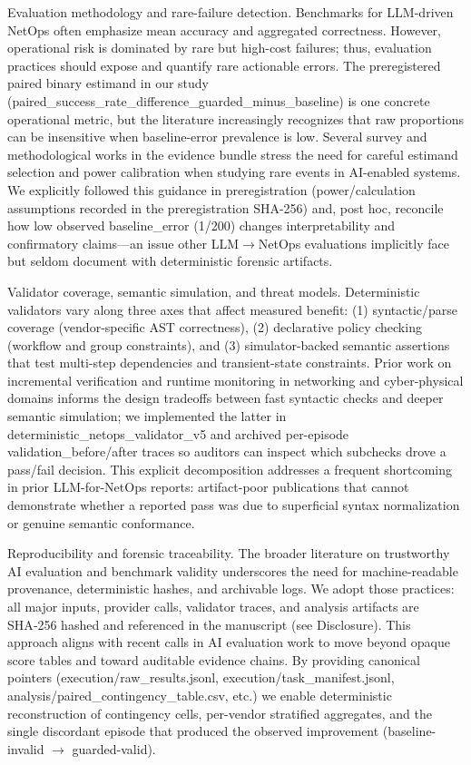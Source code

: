 \documentclass[conference]{IEEEtran}
\begin{document}
Evaluation methodology and rare-failure detection. Benchmarks for LLM-driven NetOps often emphasize mean accuracy and aggregated correctness. However, operational risk is dominated by rare but high-cost failures; thus, evaluation practices should expose and quantify rare actionable errors. The preregistered paired binary estimand in our study (paired\_success\_rate\_difference\_guarded\_minus\_baseline) is one concrete operational metric, but the literature increasingly recognizes that raw proportions can be insensitive when baseline-error prevalence is low. Several survey and methodological works in the evidence bundle stress the need for careful estimand selection and power calibration when studying rare events in AI-enabled systems. We explicitly followed this guidance in preregistration (power/calculation assumptions recorded in the preregistration SHA-256) and, post hoc, reconcile how low observed baseline\_error (1/200) changes interpretability and confirmatory claims---an issue other LLM\ensuremath{\rightarrow}NetOps evaluations implicitly face but seldom document with deterministic forensic artifacts.

Validator coverage, semantic simulation, and threat models. Deterministic validators vary along three axes that affect measured benefit: (1) syntactic/parse coverage (vendor‑specific AST correctness), (2) declarative policy checking (workflow and group constraints), and (3) simulator-backed semantic assertions that test multi-step dependencies and transient-state constraints. Prior work on incremental verification and runtime monitoring in networking and cyber-physical domains informs the design tradeoffs between fast syntactic checks and deeper semantic simulation; we implemented the latter in deterministic\_netops\_validator\_v5 and archived per-episode validation\_before/after traces so auditors can inspect which subchecks drove a pass/fail decision. This explicit decomposition addresses a frequent shortcoming in prior LLM-for-NetOps reports: artifact-poor publications that cannot demonstrate whether a reported pass was due to superficial syntax normalization or genuine semantic conformance.

Reproducibility and forensic traceability. The broader literature on trustworthy AI evaluation and benchmark validity underscores the need for machine-readable provenance, deterministic hashes, and archivable logs. We adopt those practices: all major inputs, provider calls, validator traces, and analysis artifacts are SHA‑256 hashed and referenced in the manuscript (see Disclosure). This approach aligns with recent calls in AI evaluation work to move beyond opaque score tables and toward auditable evidence chains. By providing canonical pointers (execution/raw\_results.jsonl, execution/task\_manifest.jsonl, analysis/paired\_contingency\_table.csv, etc.) we enable deterministic reconstruction of contingency cells, per-vendor stratified aggregates, and the single discordant episode that produced the observed improvement (baseline-invalid \ensuremath{\rightarrow} guarded-valid).
\end{document}
